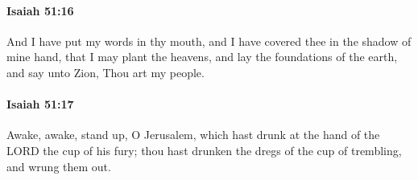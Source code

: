 		\paragraph{Isaiah 51:16} %
			\label{ISAIAH-51-16}

			And I have put my words in thy mouth, and I have covered thee in the shadow of mine hand, that I may plant the heavens, and lay the foundations of the earth, and say unto Zion, Thou art my people.


		\paragraph{Isaiah 51:17} %
			\label{ISAIAH-51-17}

			Awake, awake, stand up, O Jerusalem, which hast drunk at the hand of the LORD the cup of his fury; thou hast drunken the dregs of the cup of trembling, and wrung them out.


